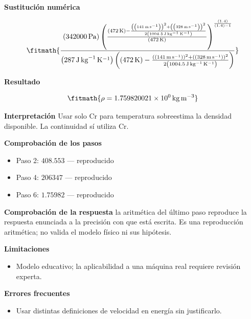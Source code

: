\documentclass[10pt,openany]{book}
\begin{document}
\begin{tcolorbox}[title={Problema resuelto 4}, studiumworked, breakable]
\noindent\textbf{Sustitución numérica}

\[
\fitmath{\frac{\left(342000\,\mathrm{Pa}\right) \left(\frac{\left(472\,\mathrm{K}\right) - \frac{\left(\left(141\,\mathrm{m}\,\mathrm{s}^{-1}\right)\right)^{2} + \left(\left(328\,\mathrm{m}\,\mathrm{s}^{-1}\right)\right)^{2}}{2 \left(1004.5\,\mathrm{J}\,\mathrm{kg}^{-1}\,\mathrm{K}^{-1}\right)}}{\left(472\,\mathrm{K}\right)}\right)^{\frac{\left(1.4\right)}{\left(1.4\right) - 1}}}{\left(287\,\mathrm{J}\,\mathrm{kg}^{-1}\,\mathrm{K}^{-1}\right) \left(\left(472\,\mathrm{K}\right) - \frac{\left(\left(141\,\mathrm{m}\,\mathrm{s}^{-1}\right)\right)^{2} + \left(\left(328\,\mathrm{m}\,\mathrm{s}^{-1}\right)\right)^{2}}{2 \left(1004.5\,\mathrm{J}\,\mathrm{kg}^{-1}\,\mathrm{K}^{-1}\right)}\right)}}
\]

\noindent\textbf{Resultado}

\[
\fitmath{\rho=1.759820021\times10^{0}\,\mathrm{kg}\,\mathrm{m}^{-3}}
\]

\noindent\textbf{Interpretación}
Usar solo Cr para temperatura sobreestima la densidad disponible. La continuidad sí utiliza Cr.

\noindent\textbf{Comprobación de los pasos}
\begin{itemize}
\item Paso 2: $408.553$ — reproducido
\item Paso 4: $206347$ — reproducido
\item Paso 6: $1.75982$ — reproducido
\end{itemize}

\noindent\textbf{Comprobación de la respuesta} la aritmética del último paso reproduce la respuesta enunciada a la precisión con que está escrita. Es una reproducción aritmética; no valida el modelo físico ni sus hipótesis.

\noindent\textbf{Limitaciones}
\begin{itemize}
\item Modelo educativo; la aplicabilidad a una máquina real requiere revisión experta.
\end{itemize}

\noindent\textbf{Errores frecuentes}
\begin{itemize}
\item Usar distintas definiciones de velocidad en energía sin justificarlo.
\end{itemize}
\end{tcolorbox}
\end{document}
